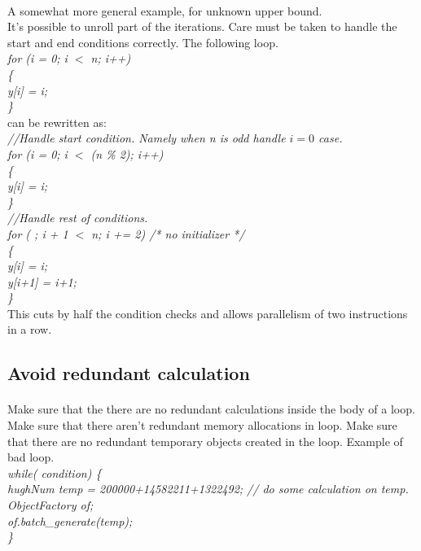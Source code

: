 \documentclass{article}
\begin{document}
 \paragraph{}
 A somewhat more general example, for unknown upper bound.\\
 It's possible to unroll part of the iterations. Care must be taken to handle the start and end conditions correctly.
 The following loop.\\
 \emph{
 for (i = 0; i $<$ n; i++)\\
   \{ \\
     y[i] = i;\\
  \}\\
 }
 can be rewritten as:\\
 \emph{
 //Handle start condition. Namely when n is odd handle $i=0$ case. \\
 for (i = 0; i $<$  (n \% 2); i++)\\
   \{ \\
     y[i] = i; \\
   \} \\
%
 //Handle rest of conditions.\\
 for ( ; i + 1 $<$ n; i += 2) /* no initializer */\\
   \{ \\
     y[i] = i; \\
     y[i+1] = i+1;  \\
   \} \\
 }
 This cuts by half the condition checks and allows parallelism of two instructions in a row.

 \subsection{Avoid redundant calculation}
 \paragraph{}
 Make sure that the there are no redundant calculations inside the body of a loop.
 Make sure that there aren't redundant memory allocations in loop.
 Make sure that there are no redundant temporary objects created in the loop. 
 Example of bad loop.\\
 \emph{
 while( condition)
 \{ \\
 hughNum temp = 200000+14582211+1322492;
%
 // do some calculation on temp.\\
 ObjectFactory of; \\
 of.batch\_generate(temp); \\
%
 \} \\ 
 }
\end{document}
